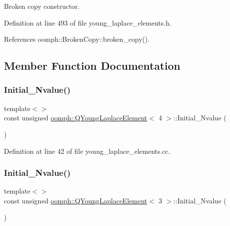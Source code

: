 Broken copy constructor. 



Definition at line 493 of file young\+\_\+laplace\+\_\+elements.\+h.



References oomph\+::\+Broken\+Copy\+::broken\+\_\+copy().



\subsection{Member Function Documentation}
\mbox{\label{classoomph_1_1QYoungLaplaceElement_ada56c2f1492ee7a00b7dc30f8367528d}} 
\subsubsection{\texorpdfstring{Initial\+\_\+\+Nvalue()}{Initial\_Nvalue()}\hspace{0.1cm}{\footnotesize\ttfamily [1/3]}}
{\footnotesize\ttfamily template$<$$>$ \\
const unsigned \hyperlink{classoomph_1_1QYoungLaplaceElement}{oomph\+::\+Q\+Young\+Laplace\+Element}$<$ 4 $>$\+::Initial\+\_\+\+Nvalue (\begin{DoxyParamCaption}{ }\end{DoxyParamCaption})\hspace{0.3cm}{\ttfamily [private]}}



Definition at line 42 of file young\+\_\+laplace\+\_\+elements.\+cc.

\mbox{\label{classoomph_1_1QYoungLaplaceElement_acbf4023d0292401b32f49d2a51aadd1b}} 
\subsubsection{\texorpdfstring{Initial\+\_\+\+Nvalue()}{Initial\_Nvalue()}\hspace{0.1cm}{\footnotesize\ttfamily [2/3]}}
{\footnotesize\ttfamily template$<$$>$ \\
const unsigned \hyperlink{classoomph_1_1QYoungLaplaceElement}{oomph\+::\+Q\+Young\+Laplace\+Element}$<$ 3 $>$\+::Initial\+\_\+\+Nvalue (\begin{DoxyParamCaption}{ }\end{DoxyParamCaption})\hspace{0.3cm}{\ttfamily [private]}}




